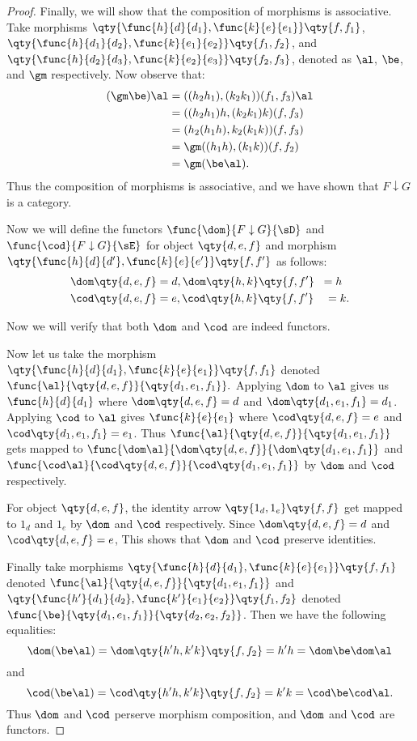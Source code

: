 \documentclass[main.tex]{subfiles}
\begin{document}
\begin{proof}
	Finally, we will show that the composition of morphisms is associative. Take
	morphisms
	$\qty{\func{h}{d}{d_1},\func{k}{e}{e_1}} \qty{f,f_1}$,
	$\qty{\func{h}{d_1}{d_2},\func{k}{e_1}{e_2}} \qty{f_1,f_2}$, and
	$\qty{\func{h}{d_2}{d_3},\func{k}{e_2}{e_3}} \qty{f_2,f_3}$, denoted as
	$\al$, $\be$, and $\gm$ respectively. Now observe that:
	\begin{align*}
	(\gm\be)\al&=((h_2h_1),(k_2 k_1))(f_1,f_3) \al\\
	&=((h_2 h_1) h,(k_2 k_1) k)(f,f_3)\\
	&=(h_2(h_1 h),k_2(k_1 k))(f,f_3)\\
	&=\gm((h_1 h),(k_1 k))(f,f_2)\\
	&=\gm(\be \al).
	\end{align*}
	Thus the composition of morphisms is associative, and we have shown
	that $F \downarrow G$ is a category.

	Now we will define the functors $\func{\dom}{F \downarrow G}{\sD}$ and
	$\func{\cod}{F \downarrow G}{\sE}$ for object $\qty{d,e,f}$ and morphism
	$\qty{\func{h}{d}{d'},\func{k}{e}{e'}} \qty{f,f'}$ as follows:
	\begin{align*}
	\dom\qty{d,e,f} &= d, \dom\qty{h,k}\qty{f,f'} \;\;= h \\
	\cod\qty{d,e,f} &= e, \cod\qty{h,k}\qty{f,f'} \quad= k.
	\end{align*}

	Now we will verify that both $\dom$ and $\cod$ are indeed functors.

	Now let us take the morphism $\qty{\func{h}{d}{d_1},\func{k}{e}{e_1}}
	\qty{f,f_1}$  denoted $\func{\al}{\qty{d,e,f}}{\qty{d_1,e_1,f_1}}.$
	Applying $\dom$ to $\al$ gives us $\func{h}{d}{d_{1}}$ where $\dom\qty{d,e,f}
	= d$ and $\dom\qty{d_1,e_1,f_1} = d_1$. Applying $\cod$ to $\al$ gives
	$\func{k}{e}{e_{1}}$ where $\cod\qty{d,e,f} = e$ and $\cod\qty{d_1,e_1,f_1} =
	e_1$. Thus $\func{\al}{\qty{d,e,f}}{\qty{d_1,e_1,f_1}}$ gets mapped to
	$\func{\dom\al}{\dom\qty{d,e,f}}{\dom\qty{d_1,e_1,f_1}}$ and
	$\func{\cod\al}{\cod\qty{d,e,f}}{\cod\qty{d_1,e_1,f_1}}$ by $\dom$ and $\cod$
	respectively.

	For object $\qty{d,e,f}$, the identity arrow $\qty{1_{d},1_{e}}\qty{f,f}$
	get mapped to $1_d$ and $1_e$ by $\dom$ and $\cod$ respectively. Since
	$\dom\qty{d,e,f} = d$ and $\cod\qty{d,e,f} = e$, This shows that $\dom$ and
	$\cod$ preserve identities.

	Finally take morphisms $\qty{\func{h}{d}{d_1},\func{k}{e}{e_1}} \qty{f,f_1}$
	denoted $\func{\al}{\qty{d,e,f}}{\qty{d_1,e_1,f_1}}$ and
	$\qty{\func{h'}{d_1}{d_2},\func{k'}{e_1}{e_2}} \qty{f_1,f_2}$   denoted
	$\func{\be}{\qty{d_1,e_1,f_1}}{\qty{d_2,e_2,f_2}}$. Then we have the
	following equalities:
	\[\dom(\be \al) = \dom\qty{h'  h,k'  k}\qty{f,f_2} =h'
	 h = \dom\be  \dom\al\] and
	\[\cod(\be \al) = \cod \qty{h' h,k' k}\qty{f,f_2}=  k'
	 k = \cod\be\cod\al.\] Thus $\dom$ and $\cod$ perserve morphism
	composition, and $\dom$ and $\cod$ are functors.
\end{proof}
\end{document}

